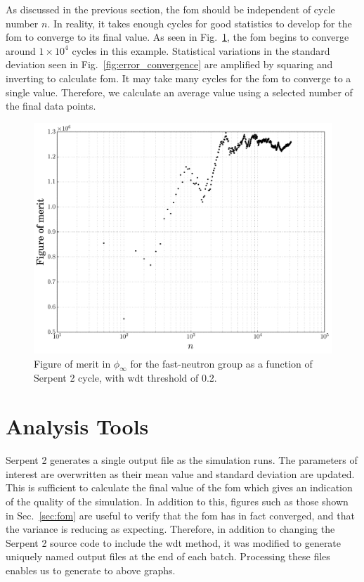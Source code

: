 As discussed in the previous section, the \gls{fom} should be
independent of cycle number $n$. In reality, it takes enough cycles
for good statistics to develop for the \gls{fom} to converge to its
final value. As seen in Fig.~\ref{fig:fom_convergence}, the \gls{fom}
begins to converge around $1\times 10^4$ cycles in this example. Statistical
variations in the standard deviation seen in
Fig.~\ref{fig:error_convergence} are amplified by squaring and
inverting to calculate \gls{fom}. It may take many cycles for the
\gls{fom} to converge to a single value. Therefore, we calculate an
average value using a selected number of the final data points.
\begin{figure}[hbtp]
  \centering
  \includegraphics[scale=0.5]{images/fom_convergence_example}
  \caption[Figure of merit in $\phi_{\infty}$ for the fast-neutron group as a
    function of Serpent 2 cycle.]{Figure of merit in $\phi_{\infty}$ for the fast-neutron group as a
    function of Serpent 2 cycle, with \gls{wdt} threshold of 0.2.}
  \label{fig:fom_convergence}
\end{figure}

\section{Analysis Tools}
\label{sec:analysis}

Serpent 2 generates a single output file as the simulation runs. The
parameters of interest are overwritten as their mean value and
standard deviation are updated. This is sufficient to calculate the
final value of the \gls{fom} which gives an indication of the quality
of the simulation. In addition to this, figures such as those shown in
Sec.~\ref{sec:fom} are useful to verify that the \gls{fom} has in fact
converged, and that the variance is reducing as expecting. Therefore,
in addition to changing the Serpent 2 source code to include the
\gls{wdt} method, it was modified to generate uniquely named output
files at the end of each batch. Processing these files enables us to
generate to above graphs.

